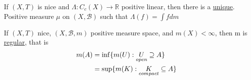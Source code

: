 \begin{theorem}
	If $(X,T)$ is nice and  $\Lambda : C_c (X) \to \mathbb{R}$ positive linear, then there is a \underline{unique}. Positive measure $\mu$ on $(X,\mathcal{B})$ such that  $\Lambda(f) = \int f dm$
\end{theorem}

\begin{lemma}
	If $(X,T)$ nice,  $(X, \mathcal{B}, m)$ positive measure space, and $m(X) < \infty$, then m is \underline{regular}, that is
	\begin{align}
		m(A) &= \inf\{m(U) : \underset{open}{U} \supseteq A\} \\
			 &= \sup\{m(K) : \underset{compact}{K} \subseteq A\}
	\end{align}
\end{lemma}

